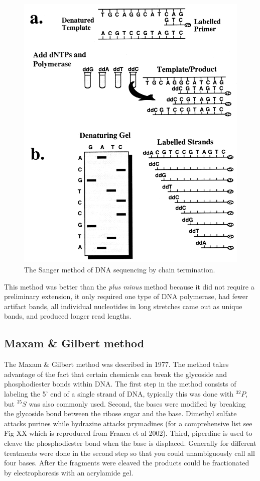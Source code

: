 \documentclass{report}\usepackage[]{graphicx}\usepackage[]{color}
\begin{document}
\begin{figure}[h]
\centering
     \includegraphics[width=.5\textwidth]{images/Sanger.pdf}
    \caption{The Sanger method of DNA sequencing by chain termination.}
\label{fig:Sanger}
\end{figure}


This method was better than the \textit{plus minus} method because it did not require a preliminary extension,
it only required one type of DNA polymerase, had fewer artifact bands, all individual nucleotides in long stretches came
out as unique bands, and produced longer read lengths.       
 
\subsection*{Maxam \& Gilbert method}
The Maxam \& Gilbert method was described in 1977. The method takes advantage of the fact that 
certain chemicals can break
the glycoside and phosphodiester bonds within DNA. The first step in the method consists of labeling the 5' end of a 
single strand of DNA,
typically this was done with $^{32}P$, but $^{35}S$ was also commonly used. Second, the bases were modified by
breaking the glycoside bond between the ribose sugar and the base. Dimethyl sulfate attacks purines 
while hydrazine attacks prymadines (for a
comprehensive list see Fig XX which is reproduced from Franca et al 2002). Third, piperdine is used to cleave the 
phosphodiester bond when the base is displaced. Generally for different treatments were done in the second step
so that you could unambiguously call all four bases. After the fragments were cleaved the products could be 
fractionated by electrophoresis with an acrylamide gel. 
\end{document}
